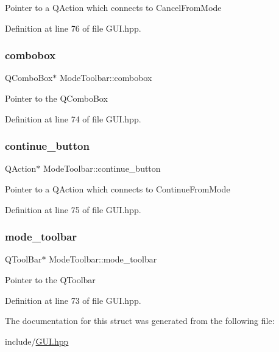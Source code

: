 Pointer to a Q\+Action which connects to Cancel\+From\+Mode 

Definition at line 76 of file G\+U\+I.\+hpp.

\mbox{\label{structModeToolbar_ad0ba4f03ef2a44e2543add404a50b4f1}} 
\subsubsection{\texorpdfstring{combobox}{combobox}}
{\footnotesize\ttfamily Q\+Combo\+Box$\ast$ Mode\+Toolbar\+::combobox}

Pointer to the Q\+Combo\+Box 

Definition at line 74 of file G\+U\+I.\+hpp.

\mbox{\label{structModeToolbar_af7d7766f5b1710abb382c42689e963ca}} 
\subsubsection{\texorpdfstring{continue\+\_\+button}{continue\_button}}
{\footnotesize\ttfamily Q\+Action$\ast$ Mode\+Toolbar\+::continue\+\_\+button}

Pointer to a Q\+Action which connects to Continue\+From\+Mode 

Definition at line 75 of file G\+U\+I.\+hpp.

\mbox{\label{structModeToolbar_acc6bcdd91825343f34ec38d312418234}} 
\subsubsection{\texorpdfstring{mode\+\_\+toolbar}{mode\_toolbar}}
{\footnotesize\ttfamily Q\+Tool\+Bar$\ast$ Mode\+Toolbar\+::mode\+\_\+toolbar}

Pointer to the Q\+Toolbar 

Definition at line 73 of file G\+U\+I.\+hpp.



The documentation for this struct was generated from the following file\+:\begin{DoxyCompactItemize}
\item 
include/\mbox{\hyperlink{GUI_8hpp}{G\+U\+I.\+hpp}}\end{DoxyCompactItemize}
